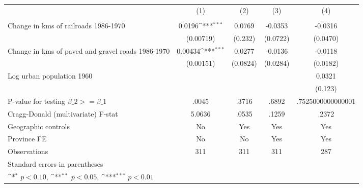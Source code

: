 {
\def\sym#1{\ifmmode^{#1}\else\(^{#1}\)\fi}
\begin{tabular}{l*{4}{c}}
\hline\hline
                &\multicolumn{1}{c}{(1)}&\multicolumn{1}{c}{(2)}&\multicolumn{1}{c}{(3)}&\multicolumn{1}{c}{(4)}\\
                &\multicolumn{1}{c}{}&\multicolumn{1}{c}{}&\multicolumn{1}{c}{}&\multicolumn{1}{c}{}\\
\hline
Change in kms of railroads 1986-1970&   0.0196\sym{***}&   0.0769         &  -0.0353         &  -0.0316         \\
                &(0.00719)         &  (0.232)         & (0.0722)         & (0.0470)         \\
[1em]
Change in kms of paved and gravel roads 1986-1970&  0.00434\sym{***}&   0.0277         &  -0.0136         &  -0.0118         \\
                &(0.00151)         & (0.0824)         & (0.0284)         & (0.0182)         \\
[1em]
Log urban population 1960&                  &                  &                  &   0.0321         \\
                &                  &                  &                  &  (0.123)         \\
\hline
P-value for testing $\beta\_{2} >= \beta\_{1}$&    .0045         &    .3716         &    .6892         &.7525000000000001         \\
Cragg-Donald (multivariate) F-stat&   5.0636         &    .0535         &    .1259         &    .2372         \\
Geographic controls&       No         &      Yes         &      Yes         &      Yes         \\
Province FE     &       No         &       No         &      Yes         &      Yes         \\
Observations    &      311         &      311         &      311         &      287         \\
\hline\hline
\multicolumn{5}{l}{\footnotesize Standard errors in parentheses}\\
\multicolumn{5}{l}{\footnotesize \sym{*} \(p<0.10\), \sym{**} \(p<0.05\), \sym{***} \(p<0.01\)}\\
\end{tabular}
}
